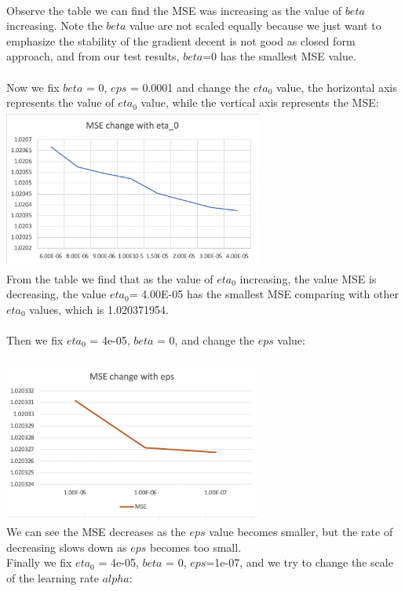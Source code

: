 \documentclass[11pt]{article}
\begin{document}
\\
Observe the table we can find the MSE was increasing as the value of $beta$ increasing. Note the $beta$ value are not scaled equally because we just want to emphasize the stability of the gradient decent is not good as closed form approach, and from our test results, $beta$=0 has the smallest MSE value.\\
\\
Now we fix $beta$ = 0, $eps$ = 0.0001 and change the $eta_0$ value, the horizontal axis represents the value of $eta_0$ value, while the vertical axis represents the MSE:\\ 
\includegraphics[width=8.5cm, height=5.3cm]{eta0.png}
\\
From the table we find that as the value of $eta_0$ increasing, the value MSE is decreasing, the value $eta_0$= 4.00E-05 has the smallest MSE comparing with other $eta_0$ values, which is 1.020371954.\\
\\
Then we fix $eta_0$ = 4e-05, $beta$ = 0, and change the $eps$ value:\\ 
\\
\includegraphics[width=8.5cm, height=5.3cm]{eps.png}
\\
We can see the MSE decreases as the $eps$ value becomes smaller, but the rate of decreasing slows down as $eps$ becomes too small.
\\
Finally we fix $eta_0$ = 4e-05, $beta$ = 0,  $eps$=1e-07, and we try to change the scale of the learning rate $alpha$:
\end{document}
